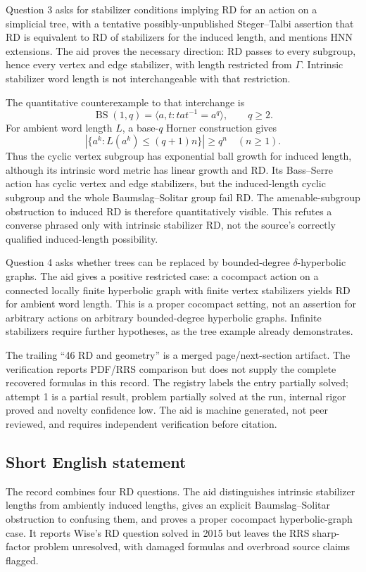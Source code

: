 \documentclass[11pt]{article}
\begin{document}
Question 3 asks for stabilizer conditions implying RD for an action on a simplicial tree, with a tentative possibly-unpublished Steger--Talbi assertion that RD is equivalent to RD of stabilizers for the induced length, and mentions HNN extensions. The aid proves the necessary direction: RD passes to every subgroup, hence every vertex and edge stabilizer, with length restricted from \(\Gamma\). Intrinsic stabilizer word length is not interchangeable with that restriction.

The quantitative counterexample to that interchange is
\[
\operatorname{BS}(1,q)=\langle a,t:tat^{-1}=a^q\rangle,\qquad q\ge2.
\]
For ambient word length \(L\), a base-\(q\) Horner construction gives
\[
\left|\{a^k:L(a^k)\le(q+1)n\}\right|\ge q^n\quad(n\ge1).
\]
Thus the cyclic vertex subgroup has exponential ball growth for induced length, although its intrinsic word metric has linear growth and RD. Its Bass--Serre action has cyclic vertex and edge stabilizers, but the induced-length cyclic subgroup and the whole Baumslag--Solitar group fail RD. The amenable-subgroup obstruction to induced RD is therefore quantitatively visible. This refutes a converse phrased only with intrinsic stabilizer RD, not the source's correctly qualified induced-length possibility.

Question 4 asks whether trees can be replaced by bounded-degree \(\delta\)-hyperbolic graphs. The aid gives a positive restricted case: a cocompact action on a connected locally finite hyperbolic graph with finite vertex stabilizers yields RD for ambient word length. This is a proper cocompact setting, not an assertion for arbitrary actions on arbitrary bounded-degree hyperbolic graphs. Infinite stabilizers require further hypotheses, as the tree example already demonstrates.

The trailing ``46 RD and geometry'' is a merged page/next-section artifact. The verification reports PDF/RRS comparison but does not supply the complete recovered formulas in this record. The registry labels the entry partially solved; attempt 1 is a partial result, problem partially solved at the run, internal rigor proved and novelty confidence low. The aid is machine generated, not peer reviewed, and requires independent verification before citation.
\subsection{Short English statement}
The record combines four RD questions. The aid distinguishes intrinsic stabilizer lengths from ambiently induced lengths, gives an explicit Baumslag--Solitar obstruction to confusing them, and proves a proper cocompact hyperbolic-graph case. It reports Wise's RD question solved in 2015 but leaves the RRS sharp-factor problem unresolved, with damaged formulas and overbroad source claims flagged.
\end{document}
